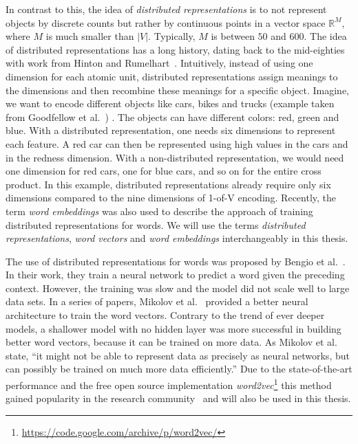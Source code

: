 \documentclass[
        a4paper,
        titlepage,
        twoside,
        parskip,
        numbers=noenddot
        ]{scrbook}
\theoremstyle{break}
\begin{document}
In contrast to this, the idea of \emph{distributed representations} is to not represent objects by discrete counts but rather by continuous points in a vector space $\mathbb{R}^M$, where $M$ is much smaller than $|V|$.
Typically, $M$ is between $50$ and $600$.
The idea of distributed representations has a long history, dating back to the mid-eighties with work from Hinton and Rumelhart~\cite{Hinton1986,Rumelhart1988}.
Intuitively, instead of using one dimension for each atomic unit, distributed representations assign meanings to the dimensions and then recombine these meanings for a specific object.
Imagine, we want to encode different objects like cars, bikes and trucks (example taken from Goodfellow et al.~\cite{Goodfellow2016}) .
The objects can have different colors: red, green and blue.
With a distributed representation, one needs six dimensions to represent each feature.
A red car can then be represented using high values in the cars and in the redness dimension.
With a non-distributed representation, we would need one dimension for red cars, one for blue cars, and so on for the entire cross product.
In this example, distributed representations already require only six dimensions compared to the nine dimensions of 1-of-V encoding.
Recently, the term \emph{word embeddings} was also used to describe the approach of training distributed representations for words.
We will use the terms \emph{distributed representations}, \emph{word vectors} and \emph{word embeddings} interchangeably in this thesis.

The use of distributed representations for words was proposed by Bengio et al.~\cite{Bengio2003}.
In their work, they train a neural network to predict a word given the preceding context.
However, the training was slow and the model did not scale well to large data sets.
In a series of papers, Mikolov et al.~\cite{Mikolov2013b,Mikolov2013,Mikolov2013a} provided a better neural architecture to train the word vectors.
Contrary to the trend of ever deeper models, a shallower model with no hidden layer was more successful in building better word vectors, because it can be trained on more data.
As Mikolov et al.~\cite{Mikolov2013a} state, ``it might not be able to represent data as precisely as neural networks, but can possibly be trained on much more data efficiently.''
Due to the state-of-the-art performance and the free open source implementation \emph{word2vec}\footnote{\url{https://code.google.com/archive/p/word2vec/}} this method gained popularity in the research community~\cite{Baroni2014,Goth2016,Navigli2015} and will also be used in this thesis.
\end{document}
